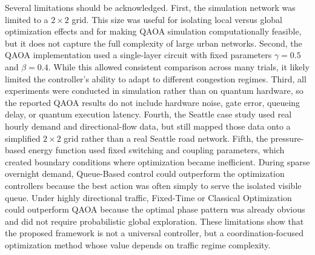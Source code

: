 \documentclass[12pt]{article}
\begin{document}
Several limitations should be acknowledged. First, the simulation network was limited to a $2 \times 2$ grid. This size was useful for isolating local versus global optimization effects and for making QAOA simulation computationally feasible, but it does not capture the full complexity of large urban networks. Second, the QAOA implementation used a single-layer circuit with fixed parameters $\gamma=0.5$ and $\beta=0.4$. While this allowed consistent comparison across many trials, it likely limited the controller's ability to adapt to different congestion regimes. Third, all experiments were conducted in simulation rather than on quantum hardware, so the reported QAOA results do not include hardware noise, gate error, queueing delay, or quantum execution latency. Fourth, the Seattle case study used real hourly demand and directional-flow data, but still mapped those data onto a simplified $2 \times 2$ grid rather than a real Seattle road network. Fifth, the pressure-based energy function used fixed switching and coupling parameters, which created boundary conditions where optimization became inefficient. During sparse overnight demand, Queue-Based control could outperform the optimization controllers because the best action was often simply to serve the isolated visible queue. Under highly directional traffic, Fixed-Time or Classical Optimization could outperform QAOA because the optimal phase pattern was already obvious and did not require probabilistic global exploration. These limitations show that the proposed framework is not a universal controller, but a coordination-focused optimization method whose value depends on traffic regime complexity.
\end{document}
